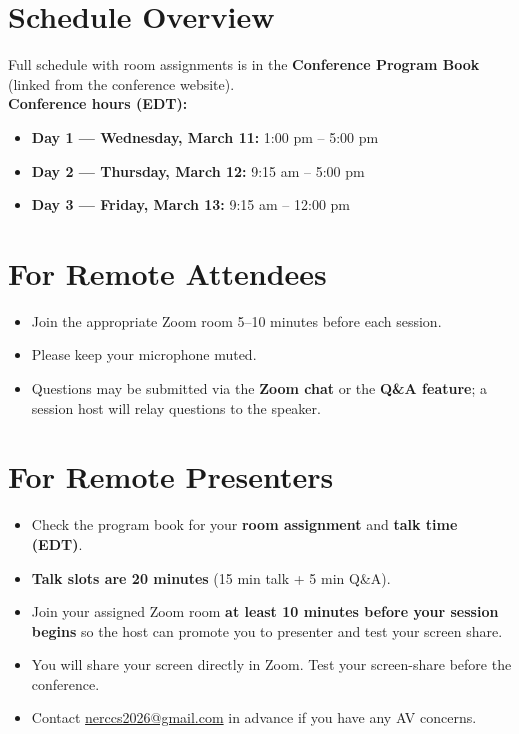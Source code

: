 \documentclass[11pt]{article}
\begin{document}
\section{Schedule Overview}

Full schedule with room assignments is in the \textbf{Conference Program Book} (linked from the conference website).\\[0.3em]
\textbf{Conference hours (EDT):}
\begin{itemize}
    \item \textbf{Day 1 — Wednesday, March 11:} 1:00 pm -- 5:00 pm
    \item \textbf{Day 2 — Thursday, March 12:} 9:15 am -- 5:00 pm
    \item \textbf{Day 3 — Friday, March 13:} 9:15 am -- 12:00 pm
\end{itemize}

\section{For Remote Attendees}

\begin{itemize}
    \item Join the appropriate Zoom room 5--10 minutes before each session.
    \item Please keep your microphone muted.
    \item Questions may be submitted via the \textbf{Zoom chat} or the \textbf{Q\&A 
    feature}; a session host will relay questions to the speaker.
\end{itemize}

\section{For Remote Presenters}

\begin{itemize}
    \item Check the program book for your \textbf{room assignment} and \textbf{talk time (EDT)}.
    \item \textbf{Talk slots are 20 minutes} (15 min talk + 5 min Q\&A).
    \item Join your assigned Zoom room \textbf{at least 10 minutes before your session begins} so the host can promote you to presenter and test your screen share.
    \item You will share your screen directly in Zoom. Test your screen-share before the conference.
    \item Contact \href{mailto:nerccs2026@gmail.com}{nerccs2026@gmail.com} in advance if you have any AV concerns.
\end{itemize}
\end{document}
